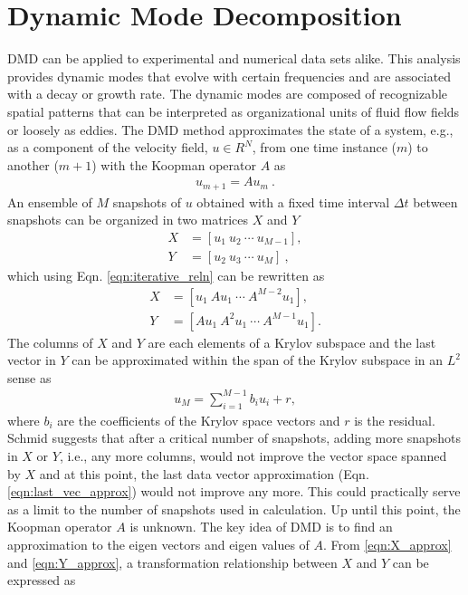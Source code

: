 \section{Dynamic Mode Decomposition} DMD can be applied to experimental and numerical data sets alike. This analysis provides dynamic modes that evolve with certain frequencies and are associated with a decay or growth rate. The dynamic modes are composed of recognizable spatial patterns that can be interpreted as organizational units of fluid flow fields or loosely as eddies. The DMD method approximates the state of a system, e.g., as a component of the velocity field, $u \in R^{N}$, from one time instance ($m$) to another ($m+1$) with the Koopman operator $A$ as
\begin{align}
u_{m+1}= A u_{m}\ .
\label{eqn:iterative_reln}
\end{align}
An ensemble of $M$ snapshots of $u$ obtained with a fixed time interval $\Delta t$ between snapshots can be organized in two matrices $X$ and $Y$
\begin{align}
X & = [u_{1}\ u_{2} \ \cdots \ u_{M-1}], \\
Y & = [u_{2}\ u_{3} \ \cdots \ u_{M}]\ ,
\end{align}
which using Eqn. \ref{eqn:iterative_reln} can be rewritten as
\begin{align}
X & = [u_{1}\ Au_{1} \ \cdots \ A^{M-2}u_{1}] \label{eqn:X_approx}, \\
Y & = [Au_{1}\ A^{2}u_{1} \ \cdots \ A^{M-1}u_{1}] \label{eqn:Y_approx}. 
\end{align}
The columns of $X$ and $Y$ are each elements of a Krylov subspace and the last vector in $Y$ can be approximated within the span of the Krylov subspace in an $L^{2}$ sense \citep{kutz_book2013} as
\begin{align}
u_{M} = \sum_{i=1}^{M-1}b_{i} u_{i}+ r,
\label{eqn:last_vec_approx}
\end{align}
where $b_i$ are the coefficients of the Krylov space vectors and $r$ is the residual. Schmid \citep{schmid_jfm2010} suggests that after a critical number of snapshots, adding more snapshots in $X$ or $Y$, i.e., any more columns, would not improve the vector space spanned by $X$ and at this point, the last data vector approximation (Eqn. \ref{eqn:last_vec_approx}) would not improve any more. This could practically serve as a limit to the number of snapshots used in calculation. Up until this point, the Koopman operator $A$ is unknown. The key idea of DMD is to find an approximation to the eigen vectors and eigen values of $A$. From \ref{eqn:X_approx} and \ref{eqn:Y_approx}, a transformation relationship between $X$ and $Y$ can be expressed as
